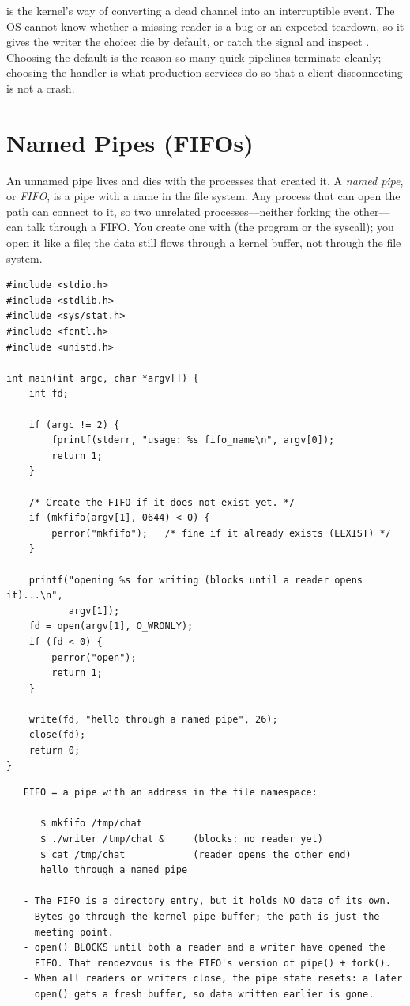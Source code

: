 \begin{osconcept}
 is the kernel's way of converting a dead channel into
an interruptible event. The OS cannot know whether a missing reader is
a bug or an expected teardown, so it gives the writer the choice:
die by default, or catch the signal and inspect . Choosing
the default is the reason so many quick pipelines terminate cleanly;
choosing the handler is what production services do so that a client
disconnecting is not a crash.
\end{osconcept}

\section{Named Pipes (FIFOs)}

An unnamed pipe lives and dies with the processes that created it. A
\emph{named pipe}, or \emph{FIFO}, is a pipe with a name in the file
system. Any process that can open the path can connect to it, so two
unrelated processes---neither forking the other---can talk through a
FIFO. You create one with  (the program or the syscall);
you open it like a file; the data still flows through a kernel buffer,
not through the file system.

\begin{lstlisting}[caption={Creating and opening a FIFO.}]
#include <stdio.h>
#include <stdlib.h>
#include <sys/stat.h>
#include <fcntl.h>
#include <unistd.h>

int main(int argc, char *argv[]) {
    int fd;

    if (argc != 2) {
        fprintf(stderr, "usage: %s fifo_name\n", argv[0]);
        return 1;
    }

    /* Create the FIFO if it does not exist yet. */
    if (mkfifo(argv[1], 0644) < 0) {
        perror("mkfifo");   /* fine if it already exists (EEXIST) */
    }

    printf("opening %s for writing (blocks until a reader opens it)...\n",
           argv[1]);
    fd = open(argv[1], O_WRONLY);
    if (fd < 0) {
        perror("open");
        return 1;
    }

    write(fd, "hello through a named pipe", 26);
    close(fd);
    return 0;
}
\end{lstlisting}

\begin{verbatim}
   FIFO = a pipe with an address in the file namespace:

      $ mkfifo /tmp/chat
      $ ./writer /tmp/chat &     (blocks: no reader yet)
      $ cat /tmp/chat            (reader opens the other end)
      hello through a named pipe

   - The FIFO is a directory entry, but it holds NO data of its own.
     Bytes go through the kernel pipe buffer; the path is just the
     meeting point.
   - open() BLOCKS until both a reader and a writer have opened the
     FIFO. That rendezvous is the FIFO's version of pipe() + fork().
   - When all readers or writers close, the pipe state resets: a later
     open() gets a fresh buffer, so data written earlier is gone.
\end{verbatim}

